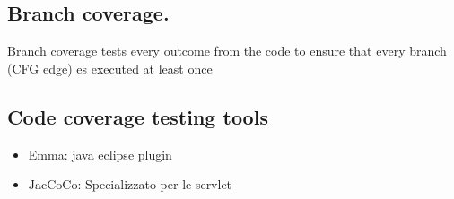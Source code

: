 \documentclass{article}
\begin{document}
\subsection{Branch coverage.}
Branch coverage tests every outcome from the code to ensure that every branch (CFG edge) es executed at least once

\subsection{Code coverage testing tools}
\begin{itemize}
    \item Emma: java eclipse plugin
    \item JacCoCo: Specializzato per le servlet
\end{itemize}
\end{document}
